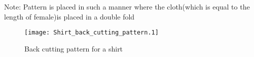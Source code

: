 \documentclass[10pt]{article}
\begin{document}
 
Note: Pattern is placed in such a manner where the cloth(which is equal to the length of female)is placed in a double fold
\begin{figure}[!ht]

\texttt{[image: Shirt\_back\_cutting\_pattern.1]}
\caption{Back cutting pattern for a shirt}
\end{figure}
\end{document}
